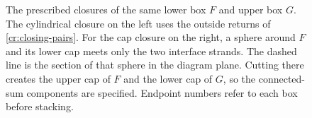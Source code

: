 \begin{figure}[ht]
\centering
\caption{The prescribed closures of the same lower box $F$ and upper box $G$. The cylindrical closure on the left uses the outside returns of \eqref{cr:closing-pairs}. For the cap closure on the right, a sphere around $F$ and its lower cap meets only the two interface strands. The dashed line is the section of that sphere in the diagram plane. Cutting there creates the upper cap of $F$ and the lower cap of $G$, so the connected-sum components are specified. Endpoint numbers refer to each box before stacking.}\label{cr:closure-figure}
\end{figure}
